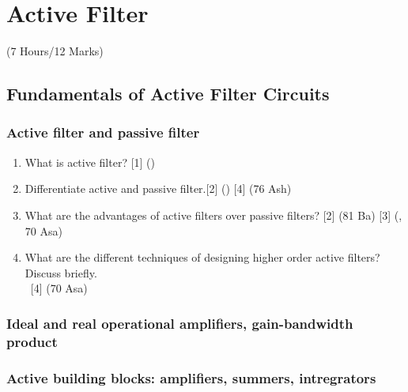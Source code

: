 \documentclass[12pt]{article}
\newcommand{\enter}{\\\textcolor{white}{1}}
\begin{document}
	\pagebreak
	
\section{Active Filter}
	\begin{center}(7 Hours/12 Marks)\end{center}
	\subsection{Fundamentals of Active Filter Circuits}
		\subsubsection{Active filter and passive filter}
		\begin{enumerate}
			\item What is active filter? \hfill [1] ()

			\item Differentiate active and passive filter.\hfill [2] () [4] (76 Ash)
			
			\item What are the advantages of active filters over passive filters? \hfill [2] (81 Ba) [3] (, 70 Asa)

			\item What are the different techniques of designing higher order active filters? Discuss briefly.
			\enter\hfill [4] (70 Asa)
		\end{enumerate}
		
		\subsubsection{Ideal and real operational amplifiers, gain-bandwidth product}
		\subsubsection{Active building blocks: amplifiers, summers, intregrators}
\end{document}
